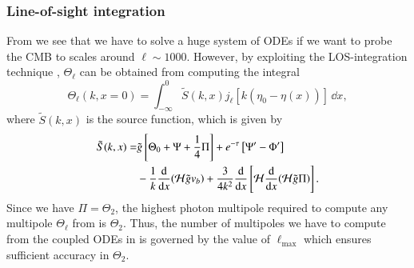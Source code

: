\subsubsection{Line-of-sight integration}\label{sssec:M3:theory:line_of_sight_integration}
From  we see that we have to solve a huge system of ODEs if we want to probe the CMB to scales around $\ell\sim1000$. However, by exploiting the LOS-integration technique , $\Theta_\ell$ can be obtained from computing the integral 
\begin{equation} \label{eq:M3:theory:Theta_ell_LOS_integration}
    \Theta_\ell(k,x=0) = \int_{-\infty}^0 \tilde{S}(k,x) j_\ell [k(\eta_0 - \eta(x))]\,\dd x, 
\end{equation}
where $\tilde{S}(k,x)$ is the source function, which is given by 
\begin{equation} \label{eq:M3:theory:source_function_LOS}
    \begin{split}
        \tilde{S}(k,x) =& \tilde{g} \left[ \Theta_0 + \Psi + \frac{1}{4} \Pi \right] + e^{-\tau}\left[ \Psi' - \Phi' \right] \\
        & - \frac{1}{k}\dv{x}(\mathcal{H} \tilde{g} v_b) + \frac{3}{4k^2}\dv{x}\left[ \mathcal{H} \dv{x}(\mathcal{H}\tilde{g}\Pi) \right].
    \end{split}
\end{equation}
Since we have $\Pi=\Theta_2$, the highest photon multipole required to compute any multipole $\Theta_\ell$ from  is $\Theta_2$. Thus, the number of multipoles we have to compute from the coupled ODEs in  is governed by the value of $\ell_\mathrm{max}$ which ensures sufficient accuracy in $\Theta_2$. 